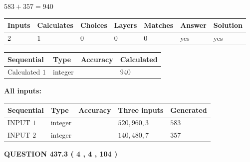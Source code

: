 \documentclass{ctexart}
\begin{document}
$ %
583 +  %
357=   %
940$
 
 
\noindent{}
 
 

 
   
   
   
   
\noindent\begin{tabular}{|l|l|l|l|l|l|l|}
 \hline
Inputs & Calculates & Choices & Layers & Matches & Answer & Solution \\ \hline
 2  & 
 1  & 
 0
  & 
 0  & 
 0  & 
  yes & 
  yes 
  \\ \hline
 \end{tabular}
   
   
   
   
\noindent{}
   
   
  
  
\noindent\begin{tabular}{|l|l|l|l|}
\hline
 Sequential & Type & Accuracy & Calculated \\ 
\hline
 
 
  Calculated $  1 $ & integer &  & 
  $ 940 $ 
 \\  \hline  
 \end{tabular}
   
   
   
   
\noindent\vspace{0.1in}\hspace{-0.08in} {\textbf{\Large{All inputs: }}}
   
   
  
  
\noindent\begin{tabular}{|l|l|l|l|l|}
\hline
 Sequential & Type & Accuracy & Three inputs & Generated \\ 
\hline
 
 
  INPUT $  1 $ & integer &  & $
 520
 , 
 960
 , 
 3
 $ & $ 583 $ 
 \\  \hline  
 
 
  INPUT $  2 $ & integer &  & $
 140
 , 
 480
 , 
 7
 $ & $ 357 $ 
 \\  \hline  
 \end{tabular}
   
   
  
\vspace{0.2in}
  
{\textbf{\Large{QUESTION
437.3 
 ( 4 , 4 , 104 )
}}}
  
\end{document}
